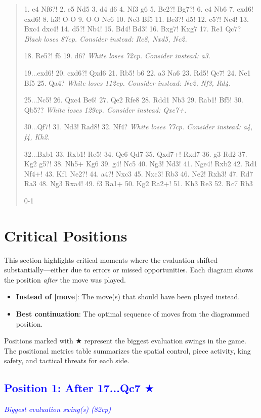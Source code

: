\documentclass[11pt]{book}
\begin{document}
\begin{quote}
1. e4 Nf6?!
2. e5 Nd5
3. d4 d6
4. Nf3 g6
5. Be2?! Bg7?!
6. c4 Nb6
7. exd6! cxd6!
8. h3! O-O
9. O-O Nc6
10. Nc3 Bf5
11. Be3?! d5!
12. c5?! Nc4!
13. Bxc4 dxc4!
14. d5?! Nb4!
15. Bd4! Bd3!
16. Bxg7! Kxg7
17. Re1 Qc7?
\textit{Black loses 87cp. Consider instead: Rc8, Nxd5, Nc2.}

18. Re5?! f6
19. d6?
\textit{White loses 72cp. Consider instead: a3.}

19...exd6!
20. cxd6?! Qxd6
21. Rb5! b6
22. a3 Na6
23. Rd5! Qe7!
24. Ne1 Bf5
25. Qa4?
\textit{White loses 112cp. Consider instead: Nc2, Nf3, Rd4.}

25...Nc5!
26. Qxc4 Be6!
27. Qe2 Rfe8
28. Rdd1 Nb3
29. Rab1! Bf5!
30. Qb5??
\textit{White loses 129cp. Consider instead: Qxe7+.}

30...Qf7!
31. Nd3! Rad8!
32. Nf4?
\textit{White loses 77cp. Consider instead: a4, f4, Kh2.}

32...Bxb1
33. Rxb1! Re5!
34. Qc6 Qd7
35. Qxd7+! Rxd7
36. g3 Rd2
37. Kg2 g5?!
38. Nh5+ Kg6
39. g4! Nc5
40. Ng3! Nd3!
41. Nge4! Rxb2
42. Rd1 Nf4+!
43. Kf1 Ne2?!
44. a4?! Nxc3
45. Nxc3! Rb3
46. Ne2! Rxh3!
47. Rd7 Ra3
48. Ng3 Rxa4!
49. f3 Ra1+
50. Kg2 Ra2+!
51. Kh3 Re3
52. Rc7 Rb3

0-1
\end{quote}

\section{Critical Positions}

This section highlights critical moments where the evaluation shifted substantially---either due to errors or missed opportunities. Each diagram shows the position \emph{after} the move was played.

\begin{itemize}
\item \textbf{Instead of [move]}: The move(s) that should have been played instead.
\item \textbf{Best continuation}: The optimal sequence of moves from the diagrammed position.
\end{itemize}

Positions marked with {\color{blue}$\bigstar$} represent the biggest evaluation swings in the game. The positional metrics table summarizes the spatial control, piece activity, king safety, and tactical threats for each side.

\subsection*{\textcolor{blue}{Position 1: After 17...Qc7 $\bigstar$}}
\textit{\textcolor{blue}{Biggest evaluation swing(s) (82cp)}}
\end{document}
